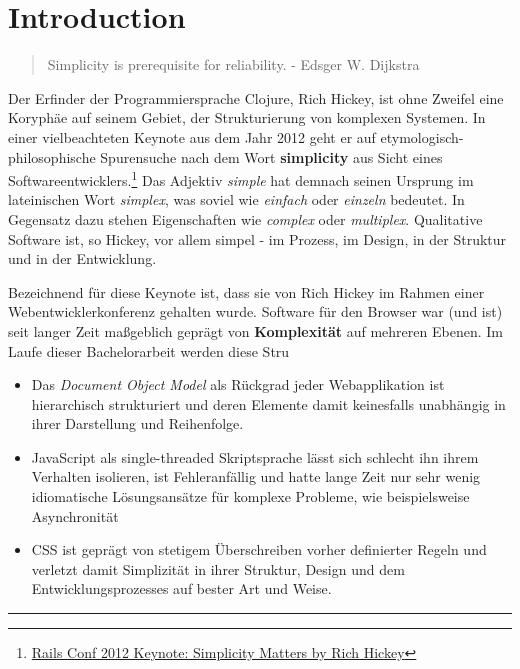 \documentclass[]{assets/latex/ieee}
\date{}
\providecommand{\tightlist}{%
  \setlength{\itemsep}{0pt}\setlength{\parskip}{0pt}}
\begin{document}
\section{Introduction}\label{introduction}

\begin{quote}
Simplicity is prerequisite for reliability. - Edsger W. Dijkstra
\end{quote}

Der Erfinder der Programmiersprache Clojure, Rich Hickey, ist ohne
Zweifel eine Koryphäe auf seinem Gebiet, der Strukturierung von
komplexen Systemen. In einer vielbeachteten Keynote aus dem Jahr 2012
geht er auf etymologisch-philosophische Spurensuche nach dem Wort
\textbf{simplicity } aus Sicht eines Softwareentwicklers.\footnote{\href{https://www.youtube.com/watch?v=rI8tNMsozo0\&t=48s}{Rails
  Conf 2012 Keynote: Simplicity Matters by Rich Hickey}} Das Adjektiv
\emph{simple} hat demnach seinen Ursprung im lateinischen Wort
\emph{simplex}, was soviel wie \emph{einfach} oder \emph{einzeln}
bedeutet. In Gegensatz dazu stehen Eigenschaften wie \emph{complex} oder
\emph{multiplex}. Qualitative Software ist, so Hickey, vor allem simpel
- im Prozess, im Design, in der Struktur und in der Entwicklung.

Bezeichnend für diese Keynote ist, dass sie von Rich Hickey im Rahmen
einer Webentwicklerkonferenz gehalten wurde. Software für den Browser
war (und ist) seit langer Zeit maßgeblich geprägt von
\textbf{Komplexität} auf mehreren Ebenen. Im Laufe dieser Bachelorarbeit
werden diese Stru

\begin{itemize}
\tightlist
\item
  Das \emph{Document Object Model} als Rückgrad jeder Webapplikation ist
  hierarchisch strukturiert und deren Elemente damit keinesfalls
  unabhängig in ihrer Darstellung und Reihenfolge.
\item
  JavaScript als single-threaded Skriptsprache lässt sich schlecht ihn
  ihrem Verhalten isolieren, ist Fehleranfällig und hatte lange Zeit nur
  sehr wenig idiomatische Lösungsansätze für komplexe Probleme, wie
  beispielsweise Asynchronität
\item
  CSS ist geprägt von stetigem Überschreiben vorher definierter Regeln
  und verletzt damit Simplizität in ihrer Struktur, Design und dem
  Entwicklungsprozesses auf bester Art und Weise.
\end{itemize}

\begin{center}\rule{0.5\linewidth}{\linethickness}\end{center}
\end{document}
